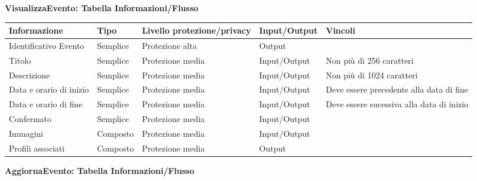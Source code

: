 \textbf{VisualizzaEvento: Tabella Informazioni/Flusso}
\hfill \break

\begin{tabular} {|P{3cm}|P{3cm}|P{3cm}|P{3cm}|P{3cm}|}
    \hline
    \textbf{Informazione}   & \textbf{Tipo} & \textbf{Livello protezione/privacy} & \textbf{Input/Output} & \textbf{Vincoli}                          \\
    \hline
    Identificativo Evento   & Semplice      & Protezione alta                     & Output                &                                           \\
    \hline
    Titolo                  & Semplice      & Protezione media                    & Input/Output          & Non più di 256 caratteri                  \\
    \hline
    Descrizione             & Semplice      & Protezione media                    & Input/Output          & Non più di 1024 caratteri                 \\
    \hline
    Data e orario di inizio & Semplice      & Protezione media                    & Input/Output          & Deve essere precedente alla data di fine  \\
    \hline
    Data e orario di fine   & Semplice      & Protezione media                    & Input/Output          & Deve essere sucessiva alla data di inizio \\
    \hline
    Confermato              & Semplice      & Protezione media                    & Input/Output          &                                           \\
    \hline
    Immagini                & Composto      & Protezione media                    & Input/Output          &                                           \\
    \hline
    Profili associati       & Composto      & Protezione media                    & Output                &                                           \\
    \hline
\end{tabular}
\hfill \break
\clearpage
\textbf{AggiornaEvento: Tabella Informazioni/Flusso}
\hfill \break

